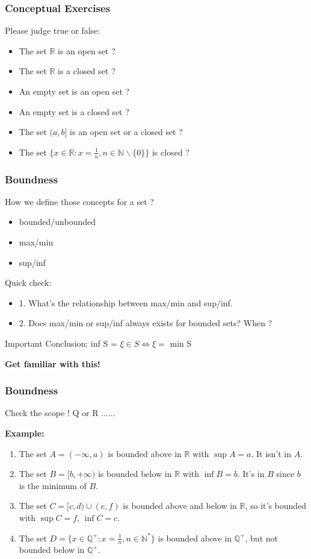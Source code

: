 \documentclass{beamer}
\begin{document}
\begin{frame}
    \frametitle{Conceptual Exercises}
    Please judge true or false:
    \begin{itemize}
        \item The set $\mathbb{R}$ is an open set ?
        \item The set $\mathbb{R}$ is a closed set ?
        \item An empty set is an open set ?
        \item An empty set is a closed set ?
        \item The set $(a,b]$ is an open set or a closed set ?
        \item The set $\{x\in \mathbb{R}: x=\frac{1}{n}, n\in \mathbb{N}\backslash\{0\}\}$ is closed ?
    \end{itemize}
\end{frame}

\begin{frame}
    \frametitle{Boundness}
    How we define those concepts for a set ?
    \begin{itemize}
        \item bounded/unbounded
        \item max/min
        \item sup/inf
    \end{itemize}
    \begin{block}{Quick check:}
        \begin{itemize}
            \item 1. What's the relationship between max/min and sup/inf.
            \item 2. Does max/min or sup/inf always exists for bounded sets? When ?
        \end{itemize}
        Important Conclusion: inf S = $\xi \in S \Leftrightarrow \xi=$ min S
    \end{block}
    \vspace{1em}
    \textbf{Get familiar with this!}
\end{frame}



\begin{frame}
    \frametitle{Boundness}
    Check the scope ! Q or R ......

    \textbf{Example:}\\
    \begin{enumerate}
        \item The set $A=(-\infty, a)$ is bounded above in $\mathbb{R}$ with $\sup A=a$. It isn't in $A$.
        \item The set $B=[b,+\infty)$ is bounded below in $\mathbb{R}$ with $\inf B=b$. It's in $B$ since $b$ is the minimum of $B$.
        \item The set $C=[c,d)\cup(e,f)$ is bounded above and below in $\mathbb{R}$, so it's bounded with $\sup C=f$, $\inf C=c$.
        \item The set $D=\{x\in \mathbb{Q}^+: x=\frac{1}{n}, n\in \mathbb{N}^*\}$ is bounded above in $\mathbb{Q}^+$, but not bounded
              below in $\mathbb{Q}^+$.
    \end{enumerate}
\end{frame}
\end{document}
